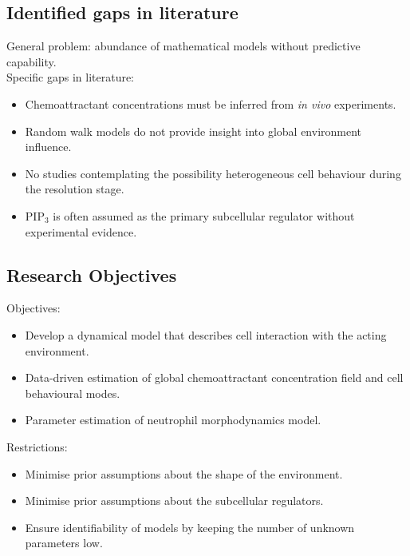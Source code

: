 \documentclass[mathserif,11pt]{beamer}
\begin{document}
\subsection{Identified gaps in literature}
\begin{frame}
General problem: abundance of mathematical models without predictive capability.\\
\vspace{0.2cm}
Specific gaps in literature:
\begin{itemize}
	\item Chemoattractant concentrations must be inferred from \textit{in vivo} experiments.
	\item Random walk models do not provide insight into global environment influence.
	\item No studies contemplating the possibility heterogeneous cell behaviour during the resolution stage.
	\item PIP$_3$ is often assumed as the primary subcellular regulator without experimental evidence.
\end{itemize}
\vspace{0.2cm}
\centering
{}
\end{frame}
\subsection{Research Objectives}
\begin{frame}
Objectives:
\begin{itemize}
	\item Develop a dynamical model that describes cell interaction with the acting environment.
	\item Data-driven estimation of global chemoattractant concentration field and cell behavioural modes.
	\item Parameter estimation of neutrophil morphodynamics model.
\end{itemize}
\vspace{0.3cm}
Restrictions:
  \begin{itemize}
  	\item Minimise prior assumptions about the shape of the environment.
  	\item Minimise prior assumptions about the subcellular regulators.
  	\item Ensure identifiability of models by keeping the number of unknown parameters low. 
  	\end{itemize}
\end{frame}
\end{document}

